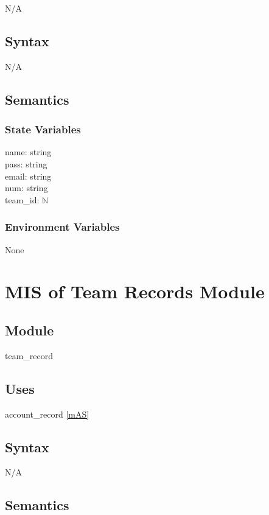 \documentclass[12pt, titlepage]{article}
\begin{document}
N/A

\subsection{Syntax}

N/A

\subsection{Semantics}

\subsubsection{State Variables}

name: string\\
pass: string\\
email: string\\
num: string\\
team\_id: $\mathbb{N}$

\subsubsection{Environment Variables}

None

\newpage

\section{MIS of Team Records Module} \label{mTS}

\subsection{Module}

team\_record

\subsection{Uses}

account\_record \ref{mAS}

\subsection{Syntax}

N/A

\subsection{Semantics}
\end{document}
